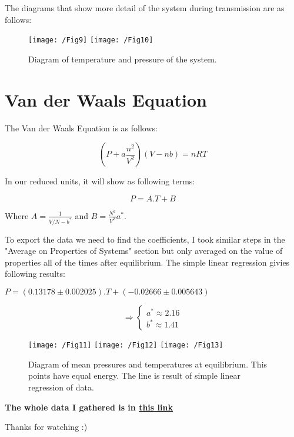 \documentclass{article}
\begin{document}
    The diagrams that show more detail of the system during transmission are as follows:

    \begin{figure}[!htb]
        \centering
        \texttt{[image: /Fig9]}
        \label{fig.9}
        \texttt{[image: /Fig10]}
        \label{fig.10}
        \caption{Diagram of temperature and pressure of the system.}
    \end{figure}

    \section*{Van der Waals Equation}

    The Van der Waals Equation is as follows:

    $$
    \left(P+a \frac{n^{2}}{V^{2}}\right)(V-n b)=n R T
    $$

    In our reduced units, it will show as following terms:

    $$
    P = A . T + B
    $$

    Where $A = \frac{1}{V/N - b^*}$ and $B = \frac{N^2}{V^2} a^*$.

    To export the data we need to find the coefficients,
    I took similar steps in the "Average on Properties of Systems" section but only averaged on the value of properties all of the times after equilibrium.
    The simple linear regression givies following results:

    $P = (0.13178 \pm 0.002025).T + (-0.02666 \pm 0.005643)$

    $$
    \Rightarrow \begin{cases}
        a^* \approx 2.16\\
        b^* \approx 1.41
    \end{cases}
    $$

    \begin{figure}[!htb]
        \centering
        \texttt{[image: /Fig11]}
        \label{fig.11}
        \texttt{[image: /Fig12]}
        \label{fig.12}
        \texttt{[image: /Fig13]}
        \label{fig.13}
        \caption{Diagram of mean pressures and temperatures at equilibrium. This points have equal energy. The line is result of simple linear regression of data.}
    \end{figure}

    \pagebreak

    \centering
    \textbf{The whole data I gathered is in \href{https://github.com/shahmari/ComputationalPhysics-Fall2021/tree/main/ProblemSet10/Data}{this link}}

    Thanks for watching :)
\end{document}
